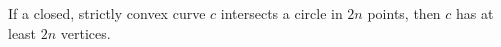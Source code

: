 If a closed, strictly convex curve $c$ intersects a circle in $2n$ points, then $c$ has at least $2n$ vertices.